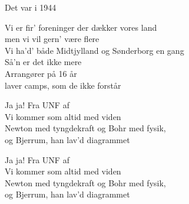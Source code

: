 \begin{song}{Det var i 1944}
  \begin{SBVerse}
    Vi er fir' foreninger der dækker vores land\\
    men vi vil gern’ være flere\\
    Vi ha’d’ både Midtjylland og Sønderborg en gang\\
    Så’n er det ikke mere\\
    Arrangører på 16 år\\
    laver camps, som de ikke forstår
  \end{SBVerse}

  \begin{SBChorus}
    Ja ja! Fra UNF af\\
    Vi kommer som altid med viden\\
    Newton med tyngdekraft og Bohr med fysik,\\
    og Bjerrum, han lav’d diagrammet
  \end{SBChorus}

  \begin{SBChorus}
    Ja ja! Fra UNF af\\
    Vi kommer som altid med viden\\
    Newton med tyngdekraft og Bohr med fysik,\\
    og Bjerrum, han lav’d diagrammet
  \end{SBChorus}


\end{song}